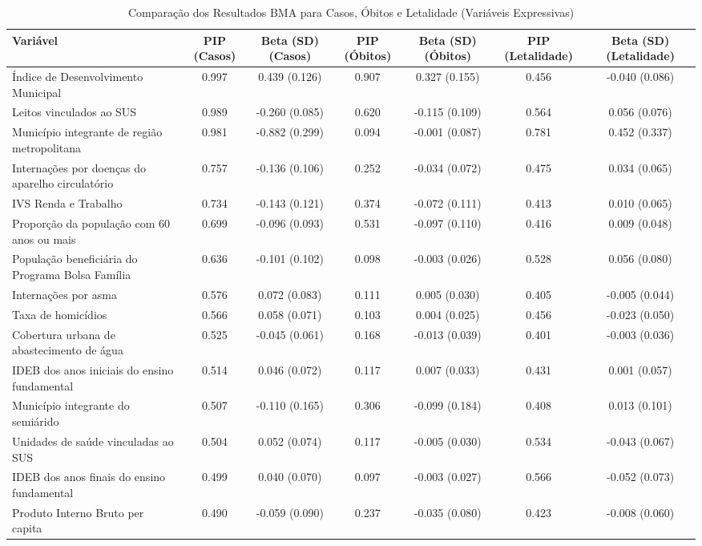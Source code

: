 \begin{table}
\caption{Comparação dos Resultados BMA para Casos, Óbitos e Letalidade (Variáveis Expressivas)}
\label{tab:bma_comparativo}
\begin{tabular}{lcccccc}
\toprule
Variável & PIP (Casos) & Beta (SD) (Casos) & PIP (Óbitos) & Beta (SD) (Óbitos) & PIP (Letalidade) & Beta (SD) (Letalidade) \\
\midrule
Índice de Desenvolvimento Municipal & 0.997 & 0.439 (0.126) & 0.907 & 0.327 (0.155) & 0.456 & -0.040 (0.086) \\
Leitos vinculados ao SUS & 0.989 & -0.260 (0.085) & 0.620 & -0.115 (0.109) & 0.564 & 0.056 (0.076) \\
Município integrante de região metropolitana & 0.981 & -0.882 (0.299) & 0.094 & -0.001 (0.087) & 0.781 & 0.452 (0.337) \\
Internações por doenças do aparelho circulatório & 0.757 & -0.136 (0.106) & 0.252 & -0.034 (0.072) & 0.475 & 0.034 (0.065) \\
IVS Renda e Trabalho & 0.734 & -0.143 (0.121) & 0.374 & -0.072 (0.111) & 0.413 & 0.010 (0.065) \\
Proporção da população com 60 anos ou mais & 0.699 & -0.096 (0.093) & 0.531 & -0.097 (0.110) & 0.416 & 0.009 (0.048) \\
População beneficiária do Programa Bolsa Família & 0.636 & -0.101 (0.102) & 0.098 & -0.003 (0.026) & 0.528 & 0.056 (0.080) \\
Internações por asma & 0.576 & 0.072 (0.083) & 0.111 & 0.005 (0.030) & 0.405 & -0.005 (0.044) \\
Taxa de homicídios & 0.566 & 0.058 (0.071) & 0.103 & 0.004 (0.025) & 0.456 & -0.023 (0.050) \\
Cobertura urbana de abastecimento de água & 0.525 & -0.045 (0.061) & 0.168 & -0.013 (0.039) & 0.401 & -0.003 (0.036) \\
IDEB dos anos iniciais do ensino fundamental & 0.514 & 0.046 (0.072) & 0.117 & 0.007 (0.033) & 0.431 & 0.001 (0.057) \\
Município integrante do semiárido & 0.507 & -0.110 (0.165) & 0.306 & -0.099 (0.184) & 0.408 & 0.013 (0.101) \\
Unidades de saúde vinculadas ao SUS & 0.504 & 0.052 (0.074) & 0.117 & -0.005 (0.030) & 0.534 & -0.043 (0.067) \\
IDEB dos anos finais do ensino fundamental & 0.499 & 0.040 (0.070) & 0.097 & -0.003 (0.027) & 0.566 & -0.052 (0.073) \\
Produto Interno Bruto per capita & 0.490 & -0.059 (0.090) & 0.237 & -0.035 (0.080) & 0.423 & -0.008 (0.060) \\

\end{tabular}
\end{table}
